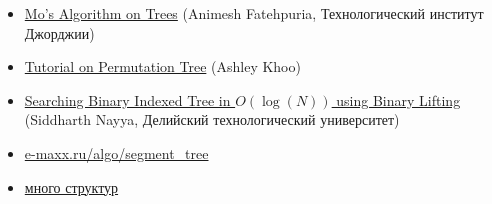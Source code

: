 \begin{itemize}
	\item \href{https://codeforces.com/blog/entry/43230}{Mo's Algorithm on Trees} (Animesh Fatehpuria, Технологический институт Джорджии)
	
	\item \href{https://codeforces.com/blog/entry/78898}{Tutorial on Permutation Tree} (Ashley Khoo)
	
	\item \href{https://codeforces.com/blog/entry/61364}{Searching Binary Indexed Tree in $O( \log(N))$ using Binary Lifting} (Siddharth Nayya, Делийский технологический университет)
	
	\item \href{https://e-maxx.ru/algo/segment_tree}{e-maxx.ru/algo/segment\_tree}
	
	\item \href{https://codeforces.com/blog/entry/15729}{много структур}
	
	
\end{itemize}



